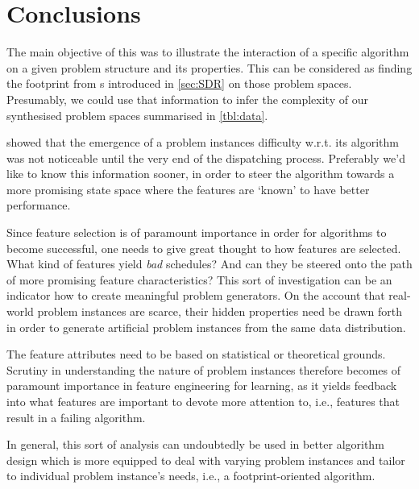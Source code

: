 \section{Conclusions}


The main objective of this  was to illustrate the 
interaction of a specific algorithm on a given problem structure and its 
properties. 
This can be considered as finding the footprint from \sdr s introduced in 
\cref{sec:SDR} on those problem spaces. 
Presumably, we could use that information to infer the complexity of our 
synthesised problem spaces summarised in \cref{tbl:data}.

 showed that the emergence of a problem instances 
difficulty w.r.t. its algorithm was not noticeable until the very end of the 
dispatching process. Preferably we'd like to know this information sooner, in 
order to steer the algorithm towards a more promising state space where the 
features are `known' to have better performance. 

Since feature selection is of paramount importance in order for algorithms to 
become successful, one needs to give great thought to how features are 
selected. What kind of features yield \emph{bad} schedules? And can they be 
steered onto the path of more promising feature characteristics? This sort of 
investigation can be an indicator how to create meaningful problem generators. 
On the account that real-world problem instances are scarce, their hidden 
properties need be drawn forth in order to generate artificial problem 
instances from the same data distribution. 

The feature attributes need to be based on statistical or theoretical grounds. 
Scrutiny in understanding the nature of problem instances therefore becomes of 
paramount importance in feature engineering for learning, as it yields feedback 
into what features are important to devote more attention to, i.e., features 
that result in a failing algorithm. 


In general, this sort of analysis can undoubtedly be used in better 
algorithm design which is more equipped to deal with varying problem instances 
and tailor to individual problem instance's needs, i.e., a footprint-oriented 
algorithm.


